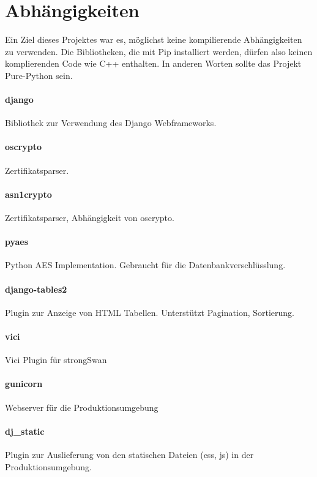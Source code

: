 \section{Abhängigkeiten}
Ein Ziel dieses Projektes war es, möglichst keine kompilierende Abhängigkeiten zu verwenden. Die Bibliotheken, die mit Pip installiert werden, dürfen also keinen komplierenden Code wie C++ enthalten. In anderen Worten sollte das Projekt Pure-Python sein. 

\paragraph{django} Bibliothek zur Verwendung des Django Webframeworks.
\paragraph{oscrypto} Zertifikatsparser.
\paragraph{asn1crypto} Zertifikatsparser, Abhängigkeit von oscrypto. 
\paragraph{pyaes} Python AES Implementation. Gebraucht für die Datenbankverschlüsslung.
\paragraph{django-tables2} Plugin zur Anzeige von HTML Tabellen. Unterstützt Pagination, Sortierung.
\paragraph{vici} Vici Plugin für strongSwan
\paragraph{gunicorn} Webserver für die Produktionsumgebung
\paragraph{dj\_static} Plugin zur Auslieferung von den statischen Dateien (css, js) in der Produktionsumgebung.

